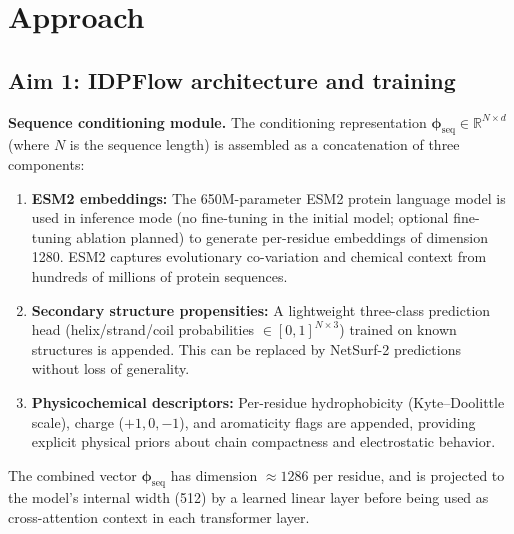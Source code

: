 \documentclass[12pt]{article}
\begin{document}
\section{Approach}

\subsection{Aim 1: IDPFlow architecture and training}

\noindent\textbf{Sequence conditioning module.}
The conditioning representation $\boldsymbol{\phi}_\mathrm{seq} \in \mathbb{R}^{N \times d}$
(where $N$ is the sequence length) is assembled as a concatenation of three components:
\begin{enumerate}
\item \textbf{ESM2 embeddings:} The 650M-parameter ESM2 protein language model
  \cite{lin2023esm2} is used in inference mode (no fine-tuning in the initial model;
  optional fine-tuning ablation planned) to generate per-residue embeddings of dimension
  1280. ESM2 captures evolutionary co-variation and chemical context from hundreds of
  millions of protein sequences.
\item \textbf{Secondary structure propensities:} A lightweight three-class prediction head
  (helix/strand/coil probabilities $\in [0,1]^{N\times3}$) trained on known structures is
  appended. This can be replaced by NetSurf-2 \cite{klausen2019netsurf} predictions without
  loss of generality.
\item \textbf{Physicochemical descriptors:} Per-residue hydrophobicity (Kyte--Doolittle scale),
  charge ($+1, 0, -1$), and aromaticity flags are appended, providing explicit physical
  priors about chain compactness and electrostatic behavior.
\end{enumerate}
The combined vector $\boldsymbol{\phi}_\mathrm{seq}$ has dimension $\approx 1286$ per
residue, and is projected to the model's internal width (512) by a learned linear layer
before being used as cross-attention context in each transformer layer.
\end{document}
